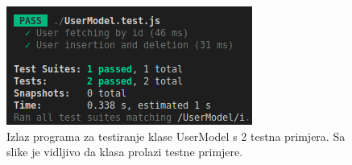                 \begin{figure}[H]
                    \includegraphics[width=\textwidth]{slike/usermodel_tests_out.png} %
                    \caption{Izlaz programa za testiranje klase UserModel s 2 testna primjera. Sa slike je vidljivo da klasa prolazi testne primjere.}
                    \label{fig:struktura} %
                \end{figure}


